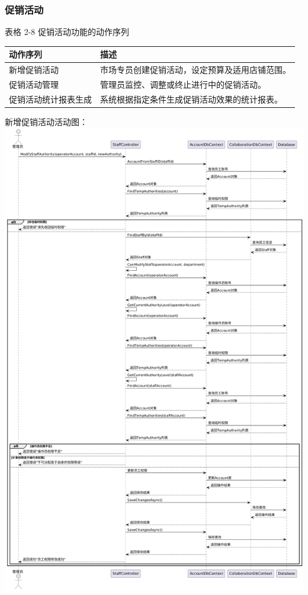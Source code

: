 \documentclass[]{article}
\begin{document}
\subsubsection{促销活动}

表格 2-8 促销活动功能的动作序列
\begin{longtable}[]{@{}ll@{}}
\toprule
动作序列 & 描述\tabularnewline
\midrule
\endhead
新增促销活动 & 市场专员创建促销活动，设定预算及适用店铺范围。\tabularnewline
促销活动管理 & 管理员监控、调整或终止进行中的促销活动。\tabularnewline
促销活动统计报表生成 & 系统根据指定条件生成促销活动效果的统计报表。\tabularnewline
\bottomrule
\end{longtable}

新增促销活动活动图：
\includegraphics{media/media/image16.png}
\end{document}
